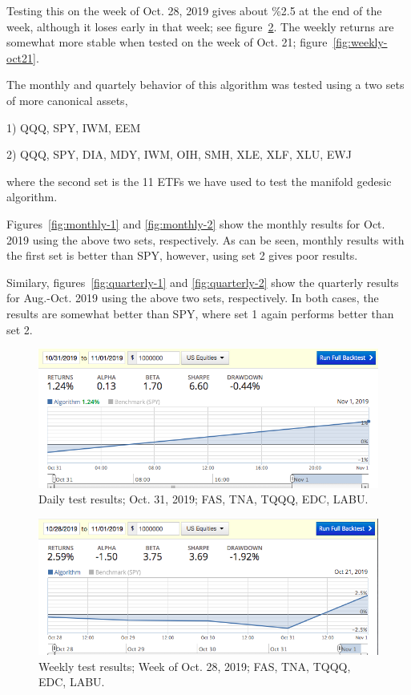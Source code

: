 \documentclass{article}
\begin{document}
Testing this on the week of Oct. 28, 2019 gives about \%2.5 at the end
of the week, although it loses early in that week; see
figure~\ref{fig:weekly-oct28}. The weekly returns are somewhat more
stable when tested on the week of Oct. 21;
figure~\ref{fig:weekly-oct21}.

The monthly and quartely behavior of this algorithm was tested using a
two sets of more canonical assets,

1) QQQ, SPY, IWM, EEM

2) QQQ, SPY, DIA, MDY, IWM, OIH, SMH, XLE, XLF, XLU, EWJ

where the second set is the 11 ETFs we have used to test the manifold gedesic algorithm.

Figures~\ref{fig:monthly-1} and \ref{fig:monthly-2} show the monthly
results for Oct. 2019 using the above two sets, respectively. As can
be seen, monthly results with the first set is better than SPY,
however, using set 2 gives poor results.

Similary, figures~\ref{fig:quarterly-1} and \ref{fig:quarterly-2} show
the quarterly results for Aug.-Oct. 2019 using the above two sets,
respectively. In both cases, the results are somewhat better than SPY,
where set 1 again performs better than set 2.

\newpage

\begin{figure}\label{fig:daily-oct31}
\includegraphics[width = \textwidth]{figures/ab-results-2019-11-05/ab-daily-oct31.png}
\caption{Daily test results; Oct. 31, 2019; FAS, TNA, TQQQ, EDC, LABU.}
\end{figure}

\begin{figure}\label{fig:weekly-oct28}
\includegraphics[width = \textwidth]{figures/ab-results-2019-11-05/ab-weekly-oct28-nov1-2019.png}
\caption{Weekly test results; Week of Oct. 28, 2019; FAS, TNA, TQQQ, EDC, LABU.}
\end{figure}
\end{document}
